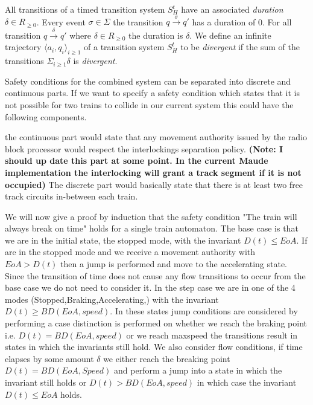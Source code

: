 \begin{mydef}
All transitions of a timed transition system $S^t_H$ have an associated \emph{duration} $\delta \in R_{\geq 0}$. Every event $\sigma \in \Sigma$ the transition $q \xrightarrow{\sigma} q'$ has a duration of 0. For all transition $q \xrightarrow{\delta} q'$ where $\delta \in R_{\geq 0}$ the duration is $\delta$.  We define an infinite trajectory $\langle a_i, q_i \rangle_{i \geq 1}$ of a transition system $S^t_H$ to be \emph{divergent} if the sum of the transitions $\Sigma_{i \geq 1} \delta$ is \emph{divergent}.
 \end{mydef}

Safety conditions for the combined system can be separated into discrete and continuous parts.  If we want to specify a safety condition which states that it is not possible for two trains to collide in our current system this could have the following components. 

the continuous part would state that any movement authority issued by the radio block processor would respect the interlockings separation policy. \textbf{(Note: I should up date this part at some point. In the current Maude implementation the interlocking will grant a track segment if it is not occupied)} The discrete part would basically state that there is at least two free track circuits in-between each train.


We will now give a proof by induction that the safety condition "The train will always break on time" holds for a single train automaton.
The base case is that we are in the initial state, the stopped mode, with the invariant $D(t) \leq EoA$. If are in the stopped mode and we receive a movement authority with $EoA > D(t)$ then a jump is performed and move to the accelerating state. Since the transition of time does not cause any flow transitions to occur from the base case we do not need to consider it. In the step case we are in one of the 4 modes (Stopped,Braking,Accelerating,) with the invariant $D(t) \geq BD(EoA,speed)$. In these states jump conditions are considered by performing a case distinction is performed on whether we reach the braking point i.e. $D(t) = BD(EoA, speed)$ or we reach maxspeed the transitions result in states in which the invariants still hold. We also consider flow conditions, if time elapses by some amount $\delta$ we either reach the breaking point $D(t) = BD(EoA,Speed)$ and perform a jump into a state in which the invariant still holds or $D(t) > BD(EoA,speed)$ in which case the invariant $D(t) \leq EoA$ holds. 


